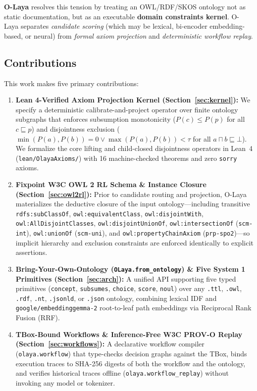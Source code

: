 \documentclass[11pt,a4paper]{article}
\begin{document}
\textbf{O-Laya} resolves this tension by treating an OWL/RDF/SKOS ontology not as static documentation, but as an executable \textbf{domain constraints kernel}. O-Laya separates \emph{candidate scoring} (which may be lexical, bi-encoder embedding-based, or neural) from \emph{formal axiom projection} and \emph{deterministic workflow replay}.

\subsection{Contributions}

This work makes five primary contributions:
\begin{enumerate}[leftmargin=1.8em,itemsep=0.25em]
  \item \textbf{Lean 4-Verified Axiom Projection Kernel (Section~\ref{sec:kernel}):} We specify a deterministic calibrate-and-project operator over finite ontology subgraphs that enforces subsumption monotonicity ($P(c) \le P(p)$ for all $c \sqsubseteq p$) and disjointness exclusion ($\min(P(a), P(b)) = 0 \lor \max(P(a), P(b)) < \tau$ for all $a \sqcap b \sqsubseteq \bot$). We formalize the core lifting and child-closed disjointness operators in Lean~4 (\texttt{lean/OlayaAxioms/}) with 16 machine-checked theorems and zero \texttt{sorry} axioms.
  \item \textbf{Fixpoint W3C OWL 2 RL Schema \& Instance Closure (Section~\ref{sec:owl2rl}):} Prior to candidate routing and projection, O-Laya materializes the deductive closure of the input ontology---including transitive \texttt{rdfs:subClassOf}, \texttt{owl:equivalentClass}, \texttt{owl:disjointWith}, \texttt{owl:AllDisjointClasses}, \texttt{owl:disjointUnionOf}, \texttt{owl:intersectionOf} (\texttt{scm-int}), \texttt{owl:unionOf} (\texttt{scm-uni}), and \texttt{owl:propertyChainAxiom} (\texttt{prp-spo2})---so implicit hierarchy and exclusion constraints are enforced identically to explicit assertions.
  \item \textbf{Bring-Your-Own-Ontology (\texttt{OLaya.from\_ontology}) \& Five System 1 Primitives (Section~\ref{sec:arch}):} A unified API supporting five typed primitives (\texttt{concept}, \texttt{subsumes}, \texttt{choice}, \texttt{score}, \texttt{noul}) over any \texttt{.ttl}, \texttt{.owl}, \texttt{.rdf}, \texttt{.nt}, \texttt{.jsonld}, or \texttt{.json} ontology, combining lexical IDF and \texttt{google/embeddinggemma-2} root-to-leaf path embeddings via Reciprocal Rank Fusion (RRF).
  \item \textbf{TBox-Bound Workflows \& Inference-Free W3C PROV-O Replay (Section~\ref{sec:workflows}):} A declarative workflow compiler (\texttt{olaya.workflow}) that type-checks decision graphs against the TBox, binds execution traces to SHA-256 digests of both the workflow and the ontology, and verifies historical traces offline (\texttt{olaya.workflow\_replay}) without invoking any model or tokenizer.

\end{enumerate}
\end{document}
